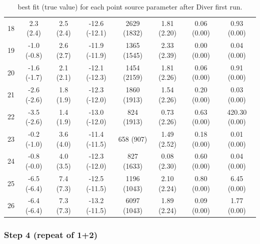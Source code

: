 \documentclass{article}
\begin{document}
\begin{table}[hbt]
\begin{tabular}{|c|c|c|c|c|c|c|c|}
18 & 2.3 (2.4) & 2.5 (2.4) & -12.6 (-12.1) & 2629 (1832) & 1.81 (2.20) & 0.06 (0.00) & 0.93 (0.00) \\
19 & -1.0 (-0.8) & 2.6 (2.7) & -11.9 (-11.9) & 1365 (1545) & 2.33 (2.39) & 0.00 (0.00) & 0.04 (0.00) \\
20 & -1.6 (-1.7) & 2.1 (2.1) & -12.1 (-12.3) & 1454 (2159) & 1.81 (2.26) & 0.06 (0.00) & 0.91 (0.00) \\
21 & -2.6 (-2.6) & 1.8 (1.9) & -12.3 (-12.0) & 1860 (1913) & 1.54 (2.26) & 0.20 (0.00) & 0.03 (0.00) \\
22 & -3.5 (-2.6) & 1.4 (1.9) & -13.0 (-12.0) & 824 (1913) & 0.73 (2.26) & 0.63 (0.00) & 420.30 (0.00) \\
23 & -0.2 (-1.0) & 3.6 (4.0) & -11.4 (-11.5) & 658 (907) & 1.49 (2.52) & 0.18 (0.00) & 0.01 (0.00) \\
24 & -0.8 (-0.0) & 4.0 (3.5) & -12.3 (-12.0) & 827 (1633) & 0.08 (2.30) & 0.60 (0.00) & 0.04 (0.00) \\
25 & -6.5 (-6.4) & 7.4 (7.3) & -12.5 (-11.5) & 1196 (1043) & 2.10 (2.24) & 0.80 (0.00) & 6.45 (0.00) \\
26 & -6.4 (-6.4) & 7.3 (7.3) & -13.2 (-11.5) & 6097 (1043) & 1.89 (2.24) & 0.09 (0.00) & 1.77 (0.00) \\
\hline
\end{tabular}
\caption{best fit (true value) for each point source parameter after Diver first run.}\label{table:DiverI}
\end{table}

\subsubsection*{Step 4 (repeat of 1+2)}
\end{document}

